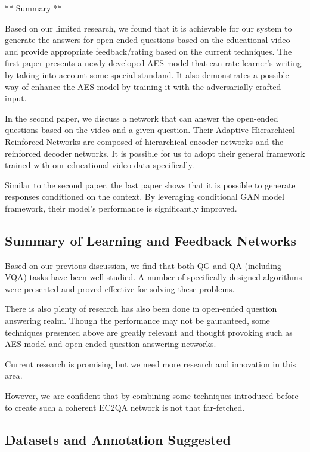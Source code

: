 \documentclass[]{book}
\theoremstyle{definition}
\theoremstyle{definition}
\theoremstyle{definition}
\theoremstyle{remark}
\begin{document}
** Summary **

Based on our limited research, we found that it is achievable for our
system to generate the answers for open-ended questions based on the
educational video and provide appropriate feedback/rating based on the
current techniques. The first paper presents a newly developed AES model
that can rate learner's writing by taking into account some special
standand. It also demonstrates a possible way of enhance the AES model
by training it with the adversarially crafted input.

In the second paper, we discuss a network that can answer the open-ended
questions based on the video and a given question. Their Adaptive
Hierarchical Reinforced Networks are composed of hierarchical encoder
networks and the reinforced decoder networks. It is possible for us to
adopt their general framework trained with our educational video data
specifically.

Similar to the second paper, the last paper shows that it is possible to
generate responses conditioned on the context. By leveraging conditional
GAN model framework, their model's performance is significantly
improved.

\subsection{Summary of Learning and Feedback
Networks}\label{summary-of-learning-and-feedback-networks}

Based on our previous discussion, we find that both QG and QA (including
VQA) tasks have been well-studied. A number of specifically designed
algorithms were presented and proved effective for solving these
problems.

There is also plenty of research has also been done in open-ended
question answering realm. Though the performance may not be gauranteed,
some techniques presented above are greatly relevant and thought
provoking such as AES model and open-ended question answering networks.

Current research is promising but we need more research and innovation
in this area.

However, we are confident that by combining some techniques introduced
before to create such a coherent EC2QA network is not that far-fetched.

\subsection{Datasets and Annotation
Suggested}\label{datasets-and-annotation-suggested}
\end{document}
